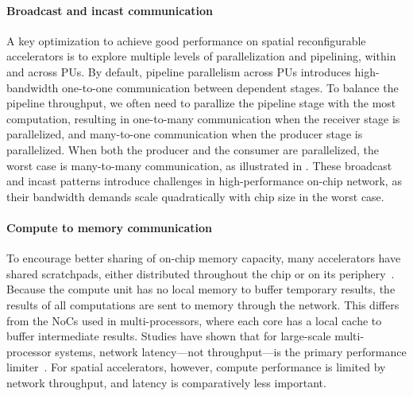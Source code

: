 
\paragraph{Broadcast and incast communication} 
A key optimization to achieve good performance on spatial reconfigurable accelerators is to explore multiple levels
of parallelization and pipelining, within and across PUs.
By default, pipeline parallelism across PUs introduces high-bandwidth one-to-one communication between dependent stages.
To balance the pipeline throughput, we often need to parallize the pipeline stage with the most
computation, resulting in one-to-many communication when the receiver stage is parallelized, and
many-to-one communication when the producer stage is parallelized.
When both the producer and the consumer are parallelized, 
the worst case is many-to-many communication, as illustrated in .
These broadcast and incast patterns introduce challenges in high-performance on-chip network, as
their bandwidth demands scale quadratically with chip size in the worst case.

\paragraph{Compute to memory communication}
To encourage better sharing of on-chip memory capacity, many accelerators have shared scratchpads, either distributed throughout the chip or on its periphery~\cite{plasticine, brainwave, streamdataflow}.
Because the compute unit has no local memory to buffer temporary results, the results of all computations are sent to memory through the network.
This differs from the NoCs used in multi-processors, where each core has a local cache to buffer intermediate results.
Studies have shown that for large-scale multi-processor systems, network latency---not throughput---is the primary performance limiter~\cite{noc}.
For spatial accelerators, however, compute performance is limited by network throughput, and latency is comparatively less important.

